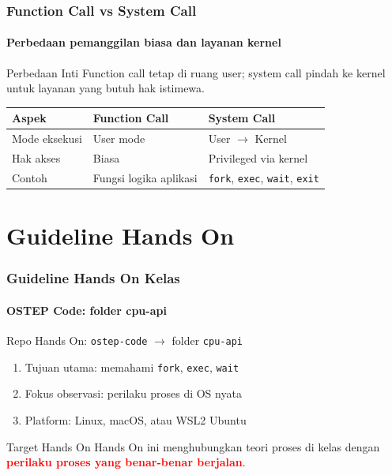 \documentclass[t,aspectratio=169,xcolor=dvipsnames]{beamer}
\newcommand{\tem}[1]{\textbf{\textcolor{red}{#1}}}
\begin{document}
\begin{frame}
    \frametitle{Function Call vs System Call}
    \framesubtitle{Perbedaan pemanggilan biasa dan layanan kernel}
    \begin{exampleblock}{Perbedaan Inti}
        Function call tetap di ruang user; system call pindah ke kernel untuk layanan yang butuh hak istimewa.
    \end{exampleblock}
    \vspace{0.1cm}
    \small
    \begin{tabular}{|p{}|p{}|p{}|}
        \hline
        \textbf{Aspek} & \textbf{Function Call} & \textbf{System Call} \\
        \hline
        Mode eksekusi & User mode & User $\rightarrow$ Kernel \\
        \hline
        Hak akses & Biasa & Privileged via kernel \\
        \hline
        Contoh & Fungsi logika aplikasi & \texttt{fork}, \texttt{exec}, \texttt{wait}, \texttt{exit} \\
        \hline
    \end{tabular}
\end{frame}

\section{Guideline Hands On}

\begin{frame}
    \frametitle{Guideline Hands On Kelas}
    \framesubtitle{OSTEP Code: folder cpu-api}
    \small
    Repo Hands On: \texttt{ostep-code} \texttt{$\rightarrow$} folder \texttt{cpu-api}
    \begin{enumerate}
        \item Tujuan utama: memahami \texttt{fork}, \texttt{exec}, \texttt{wait}
        \item Fokus observasi: perilaku proses di OS nyata
        \item Platform: Linux, macOS, atau WSL2 Ubuntu
    \end{enumerate}
    \begin{block}{Target Hands On}
        Hands On ini menghubungkan teori proses di kelas dengan \tem{perilaku proses yang benar-benar berjalan}.
    \end{block}
\end{frame}
\end{document}
